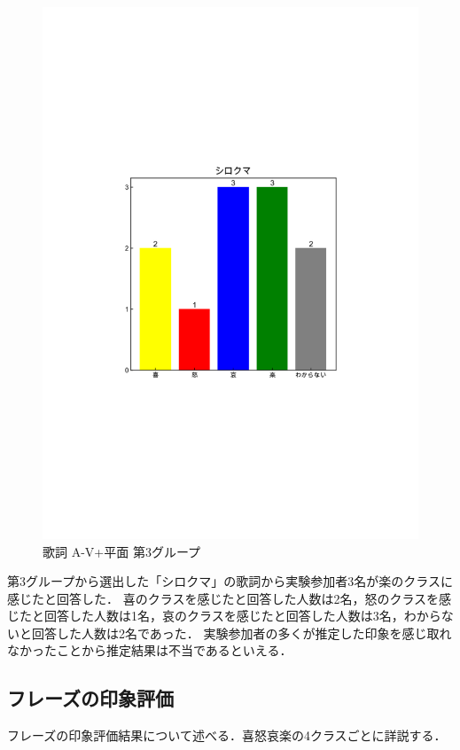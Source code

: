 \begin{figure}[H]
    \centering
    \includegraphics[width=14cm]{4324.pdf}
    \vspace{-1mm}
    \caption{歌詞 A-V+平面 第3グループ}
    \label{fig:mms}
    \vspace{5mm}
\end{figure}
第3グループから選出した「シロクマ」の歌詞から実験参加者3名が楽のクラスに感じたと回答した．
喜のクラスを感じたと回答した人数は2名，怒のクラスを感じたと回答した人数は1名，哀のクラスを感じたと回答した人数は3名，わからないと回答した人数は2名であった．
実験参加者の多くが推定した印象を感じ取れなかったことから推定結果は不当であるといえる．
\newpage
\subsection{フレーズの印象評価}
フレーズの印象評価結果について述べる．喜怒哀楽の4クラスごとに詳説する．
